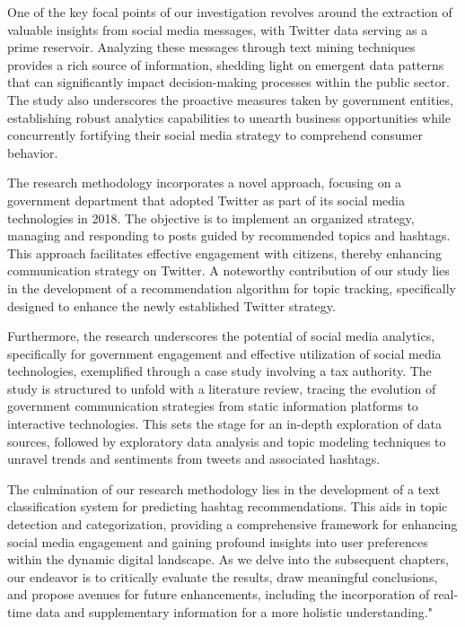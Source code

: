One of the key focal points of our investigation revolves around the extraction of valuable insights from social media messages, with Twitter data serving as a prime reservoir. Analyzing these messages through text mining techniques provides a rich source of information, shedding light on emergent data patterns that can significantly impact decision-making processes within the public sector. The study also underscores the proactive measures taken by government entities, establishing robust analytics capabilities to unearth business opportunities while concurrently fortifying their social media strategy to comprehend consumer behavior.

The research methodology incorporates a novel approach, focusing on a government department that adopted Twitter as part of its social media technologies in 2018. The objective is to implement an organized strategy, managing and responding to posts guided by recommended topics and hashtags. This approach facilitates effective engagement with citizens, thereby enhancing communication strategy on Twitter. A noteworthy contribution of our study lies in the development of a recommendation algorithm for topic tracking, specifically designed to enhance the newly established Twitter strategy.

Furthermore, the research underscores the potential of social media analytics, specifically for government engagement and effective utilization of social media technologies, exemplified through a case study involving a tax authority. The study is structured to unfold with a literature review, tracing the evolution of government communication strategies from static information platforms to interactive technologies. This sets the stage for an in-depth exploration of data sources, followed by exploratory data analysis and topic modeling techniques to unravel trends and sentiments from tweets and associated hashtags.

The culmination of our research methodology lies in the development of a text classification system for predicting hashtag recommendations. This aids in topic detection and categorization, providing a comprehensive framework for enhancing social media engagement and gaining profound insights into user preferences within the dynamic digital landscape. As we delve into the subsequent chapters, our endeavor is to critically evaluate the results, draw meaningful conclusions, and propose avenues for future enhancements, including the incorporation of real-time data and supplementary information for a more holistic understanding."

